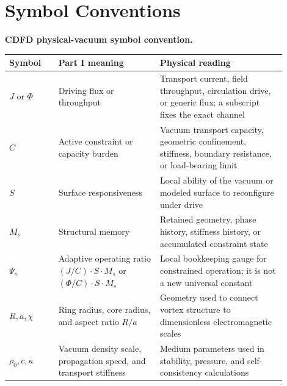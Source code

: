 \documentclass[11pt]{article}
\begin{document}
\section*{Symbol Conventions}

\noindent\textbf{CDFD physical-vacuum symbol convention.}
\begin{center}
{\small
\begin{tabular}{L{0.16\linewidth}L{0.33\linewidth}L{0.41\linewidth}}
\hline
Symbol & Part I meaning & Physical reading \\
\hline
$J$ or $\Phi$ & Driving flux or throughput & Transport current, field throughput, circulation drive, or generic flux; a subscript fixes the exact channel \\
$C$ & Active constraint or capacity burden & Vacuum transport capacity, geometric confinement, stiffness, boundary resistance, or load-bearing limit \\
$S$ & Surface responsiveness & Local ability of the vacuum or modeled surface to reconfigure under drive \\
$M_s$ & Structural memory & Retained geometry, phase history, stiffness history, or accumulated constraint state \\
$\Psi_s$ & Adaptive operating ratio $(J/C)\cdot S\cdot M_s$ or $(\Phi/C)\cdot S\cdot M_s$ & Local bookkeeping gauge for constrained operation; it is not a new universal constant \\
$R,a,\chi$ & Ring radius, core radius, and aspect ratio $R/a$ & Geometry used to connect vortex structure to dimensionless electromagnetic scales \\
$\rho_0,c,\kappa$ & Vacuum density scale, propagation speed, and transport stiffness & Medium parameters used in stability, pressure, and self-consistency calculations \\
\hline
\end{tabular}
}
\end{center}
\end{document}
